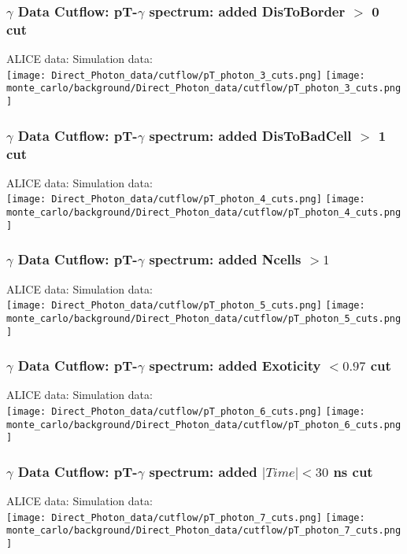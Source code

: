 \documentclass{beamer}
\begin{document}
\frame
{
	\frametitle{$\gamma$ Data Cutflow: pT-$\gamma$ spectrum: added DisToBorder $>$ 0 cut}
	\noindent\hspace{1.5 cm}ALICE data: 
	\noindent\hspace{3.0 cm} Simulation data:\\
	\texttt{[image: Direct\_Photon\_data/cutflow/pT\_photon\_3\_cuts.png]}
	\texttt{[image: monte\_carlo/background/Direct\_Photon\_data/cutflow/pT\_photon\_3\_cuts.png]}
}

\frame
{
	\frametitle{$\gamma$ Data Cutflow: pT-$\gamma$ spectrum: added DisToBadCell $>$ 1 cut}
	\noindent\hspace{1.5 cm}ALICE data: 
	\noindent\hspace{3.0 cm} Simulation data:\\
	\texttt{[image: Direct\_Photon\_data/cutflow/pT\_photon\_4\_cuts.png]}
	\texttt{[image: monte\_carlo/background/Direct\_Photon\_data/cutflow/pT\_photon\_4\_cuts.png]}
}

\frame
{
	\frametitle{$\gamma$ Data Cutflow: pT-$\gamma$ spectrum: added Ncells $> 1$}
	\noindent\hspace{1.5 cm}ALICE data: 
	\noindent\hspace{3.0 cm} Simulation data:\\
	\texttt{[image: Direct\_Photon\_data/cutflow/pT\_photon\_5\_cuts.png]}
	\texttt{[image: monte\_carlo/background/Direct\_Photon\_data/cutflow/pT\_photon\_5\_cuts.png]}
}

\frame
{
	\frametitle{$\gamma$ Data Cutflow: pT-$\gamma$ spectrum: added Exoticity $< 0.97$ cut}
	\noindent\hspace{1.5 cm}ALICE data: 
	\noindent\hspace{3.0 cm} Simulation data:\\
	\texttt{[image: Direct\_Photon\_data/cutflow/pT\_photon\_6\_cuts.png]}
	\texttt{[image: monte\_carlo/background/Direct\_Photon\_data/cutflow/pT\_photon\_6\_cuts.png]}
}

\frame
{
	\frametitle{$\gamma$ Data Cutflow: pT-$\gamma$ spectrum: added $|Time| < 30$ ns cut}
	\noindent\hspace{1.5 cm}ALICE data: 
	\noindent\hspace{3.0 cm} Simulation data:\\
	\texttt{[image: Direct\_Photon\_data/cutflow/pT\_photon\_7\_cuts.png]}
	\texttt{[image: monte\_carlo/background/Direct\_Photon\_data/cutflow/pT\_photon\_7\_cuts.png]}
}
\end{document}
